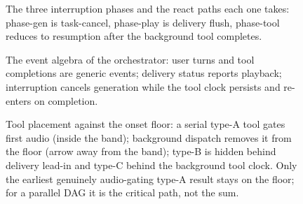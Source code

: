\begin{figure}[t]
\centering
%
\caption{The three interruption phases and the react paths each one takes: phase-gen is
task-cancel, phase-play is delivery flush, phase-tool reduces to resumption after the
background tool completes.
\label{fig:interruption_phases}}
\end{figure}

\begin{figure}[t]
\centering
%
\caption{The event algebra of the orchestrator: user turns and tool completions are generic
events; delivery status reports playback; interruption cancels generation while the tool clock
persists and re-enters on completion.
\label{fig:event_loop}}
\end{figure}

\begin{figure}[t]
\centering
%
\caption{Tool placement against the onset floor: a serial type-A tool gates first audio
(inside the band); background dispatch removes it from the floor (arrow away from the band);
type-B is hidden behind delivery lead-in and type-C behind the background tool clock.
Only the earliest genuinely audio-gating type-A result stays on the floor; for a parallel
DAG it is the critical path, not the sum.
\label{fig:tool_hiding}}
\end{figure}
